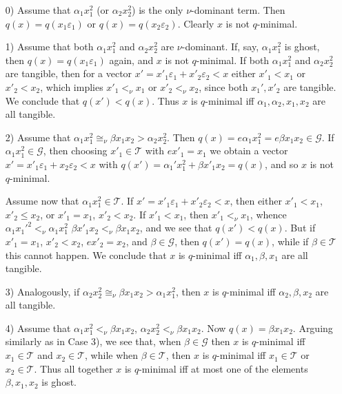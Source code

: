 \documentclass [12pt,a4paper,reqno]{amsart}
\begin{document}
\begin{enumerate} {\setlength{\itemsep}{2pt}}
\item[0)] Assume that ${\alpha}_1 x_1^2$ (or ${\alpha}_2 x_2^2$) is the only $\nu$-dominant term. Then $q(x) = q(x_1  {\varepsilon}_1)$ or $q(x) = q(x_2  {\varepsilon}_2)$. Clearly $x$  is not $q$-minimal.

\item[1)] Assume that both  ${\alpha}_1 x_1^2$ and  ${\alpha}_2 x_2^2$ are $\nu$-dominant.
If, say,  ${\alpha}_1 x_1^2$ is ghost, then $q(x) = q(x_1  {\varepsilon}_1)$ again, and $x$  is not $q$-minimal.
If  both  ${\alpha}_1 x_1^2$ and  ${\alpha}_2 x_2^2$ are tangible, then for a vector
$ x' = x'_1 {\varepsilon}_1 + x'_2 {\varepsilon}_2 < x$   either $x'_1 < x_1$ or $x'_2 < x_2$, which implies
$x'_1 <_\nu x_1$ or $x'_2 <_\nu x_2$, since both $x_1', x'_2$ are tangible. We conclude that
$q(x') < q(x)$. Thus $x$ is $q$-minimal iff ${\alpha}_1, {\alpha}_2, x_1, x_2$ are all tangible.

\item[2)] Assume that  ${\alpha}_1 x_1^2 {\cong_\nu} {\beta} x_1 x_2 > {\alpha}_2 x_2^2$. Then $q(x) = e {\alpha}_1 x_1^2 = e {\beta} x_1 x_2 \in {\mathcal G}$. If ${\alpha}_1 x_1^2 \in {\mathcal G}$, then choosing $x'_1\in {\mathcal T}$ with $e x'_1 = x_1$ we obtain a vector $ x' = x'_1 {\varepsilon}_1 + x_2 {\varepsilon}_2  < x$ with $q(x') = {\alpha}_1 'x_1^2 + {\beta} x'_1 x_2 = q(x)$, and so $x$ is not $q$-minimal.

Assume now that ${\alpha}_1 x_1^2 \in {\mathcal T}$. If $ x' = x'_1 {\varepsilon}_1 + x'_2 {\varepsilon}_2  < x$, then either
$x'_1 < x_1$, $x'_2 \leq x_2$, or $x'_1 = x_1$, $x'_2 < x_2$.
If $x'_1 < x_1$, then $x'_1 <_\nu x_1$, whence
${\alpha}_1 x_1'^2 <_\nu {\alpha}_1 x_1^2$  ${\beta} x'_1 x_2 <_\nu {\beta} x_1 x_2  $, and we see that $q(x')< q(x)$. But if
$x'_1 = x_1$, $x'_2 < x_2$, $ex'_2 = x_2$, and ${\beta} \in {\mathcal G}$, then
$q(x') = q(x)$, while if ${\beta} \in {\mathcal T}$ this cannot happen. We conclude that $x$ is $q$-minimal iff ${\alpha}_1, {\beta}, x_1$ are all tangible.

\item[3)] Analogously, if ${\alpha}_2 x_2^2 {\cong_\nu} {\beta} x_1 x_2 > {\alpha}_1 x_1^2$, then $x$ is $q$-minimal iff
${\alpha}_2, {\beta}, x_2$ are all tangible.

\item[4)] Assume that  ${\alpha}_1 x_1^2 <_\nu {\beta} x_1 x_2$, ${\alpha}_2 x_2^2 <_\nu {\beta} x_1 x_2$. Now  $q(x) = {\beta} x_1 x_2 .$
Arguing similarly as in Case 3), we see that, when ${\beta} \in {\mathcal G}$ then $x$ is
 $q$-minimal iff $x_1 \in {\mathcal T}$ and $x_2 \in {\mathcal T}$, while when ${\beta} \in {\mathcal T}$, then $x$ is
 $q$-minimal iff $x_1 \in {\mathcal T}$ or $x_2 \in {\mathcal T}$. Thus all together  $x$ is
 $q$-minimal iff at most one of the elements ${\beta}, x_1, x_2$ is ghost.
\end{enumerate}
\end{document}
